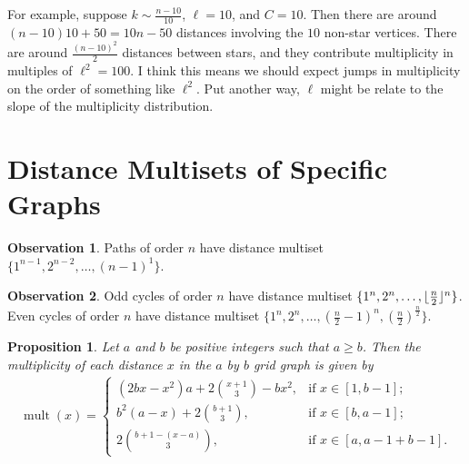 \documentclass[12]{article}
\DeclarePairedDelimiter\floor{\lfloor}{\rfloor}
\DeclareMathOperator{\mult}{mult}
\newtheorem{prop}[thm]{Proposition}
\theoremstyle{definition}
\newtheorem{obs}{Observation}
\begin{document}
	For example, suppose $k \sim \tfrac{n-10}{10}$, $\ell = 10$, and $C = 10$.  Then there are around $(n-10)10 + 50 = 10n - 50$ distances involving the $10$ non-star vertices.  There are around $\tfrac{(n-10)^2}{2}$ distances between stars, and they contribute multiplicity in multiples of $\ell^2 = 100$.  I think this means we should expect jumps in multiplicity on the order of something like $\ell^2$.  Put another way, $\ell$ might be relate to the slope of the multiplicity distribution.
	\fi
	
	\newpage
	
	\section{Distance Multisets of Specific Graphs}
	
	\begin{obs}
		Paths of order $n$ have distance multiset $\{1^{n-1},2^{n-2}, \ldots, (n-1)^1\}$.
	\end{obs}
	
	\begin{obs}
		Odd cycles of order $n$ have distance multiset $\{1^n, 2^n, \ldots, \floor{\tfrac{n}{2}}^n\}$.  Even cycles of order $n$ have distance multiset $\{1^n, 2^n, \ldots, (\tfrac{n}{2}-1)^n, (\tfrac{n}{2})^{\tfrac{n}{2}}\}$.
	\end{obs}
	
	\begin{prop}
		Let $a$ and $b$ be positive integers such that $a \geq b$.  Then the multiplicity of each distance $x$ in the $a$ by $b$ grid graph is given by
		\begin{align*}
			\mult(x) = 
			\begin{cases}
				(2bx-x^2)a + 2{x+1 \choose 3} - bx^2, &\text{if } x \in [1,b-1];	\\
				b^2(a-x) + 2{b+1 \choose 3}, &\text{if }x \in [b,a-1];	\\
				2{b+1 - (x-a) \choose 3}, &\text{if }x \in [a,a-1+b-1].
			\end{cases}
		\end{align*}
	\end{prop}
	
\end{document}
